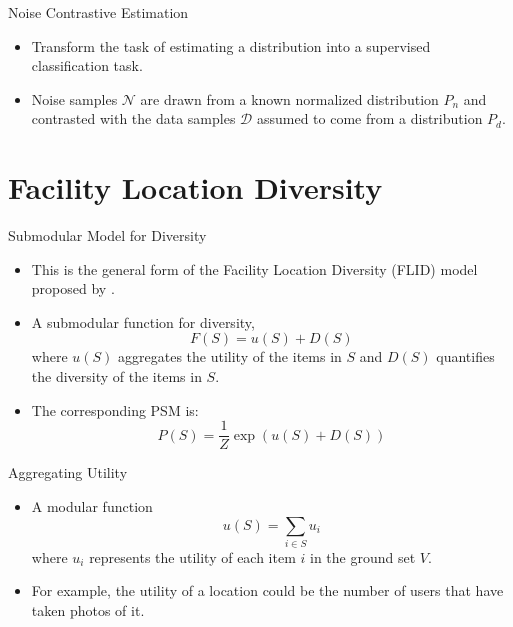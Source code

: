 \documentclass{beamer}
\begin{document}
\begin{frame}{Noise Contrastive Estimation}
  \begin{itemize}
    \item Transform the task of estimating a distribution into a supervised classification task.
    \item Noise samples $\mathcal{N}$ are drawn from a known normalized distribution $P_{n}$ and contrasted with the data samples $\mathcal{D}$ assumed to come from a distribution $P_{d}$.
  \end{itemize}
\end{frame}

\section{Facility Location Diversity}

\begin{frame}{Submodular Model for Diversity}
  \begin{itemize}
    \item This is the general form of the Facility Location Diversity (FLID) model proposed by \citet{tschiatschek16learning}.
    \item A submodular function for diversity,
      \begin{equation*}
        F(S) = u(S) + D(S)
      \end{equation*}
    where $u(S)$ aggregates the utility of the items in $S$ and $D(S)$ quantifies the diversity of the items in $S$.
   \item The corresponding PSM is:
     \begin{equation*}
       P(S) = \frac{1}{Z}\exp{\left(u(S) + D(S)\right)}
     \end{equation*}
  \end{itemize}
\end{frame}

\begin{frame}{Aggregating Utility}
  \begin{itemize}
    \item A modular function
      \begin{equation*}
        u(S) = \sum_{i \in S}u_{i}
      \end{equation*}
    where $u_{i}$ represents the utility of each item $i$ in the ground set $V$.
    \item For example, the utility of a location could be the number of users that have taken photos of it.
  \end{itemize}
\end{frame}
\end{document}
